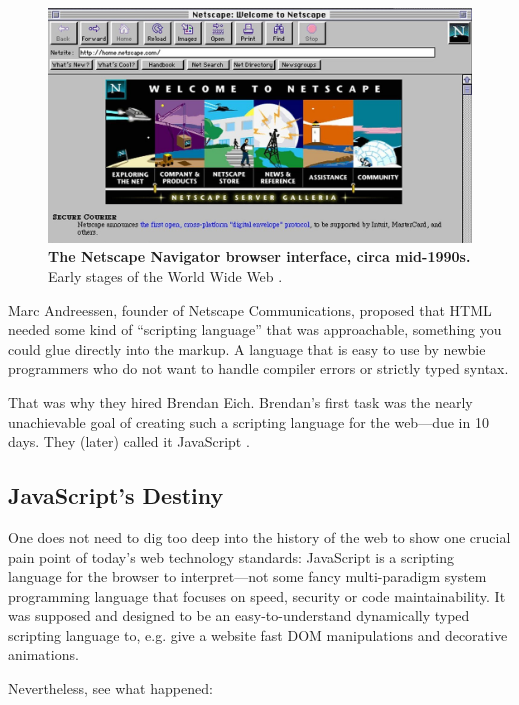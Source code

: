 \documentclass[10pt]{article}
\begin{document}
\begin{sloppypar}
  \begin{figure}[ht]
    \centering
    \includegraphics[width=\textwidth]{figures/netscape.jpg}
    \caption[The Netscape Navigator browser interface, circa mid-1990s]{\textbf{The Netscape Navigator browser interface, circa mid-1990s.} Early stages of the World Wide Web \citep{npr_home_nodate}.}
    \label{fig:netscape}
  \end{figure}

  Marc Andreessen, founder of Netscape Communications, proposed that HTML needed some kind of “scripting language” that was approachable, something you could glue directly into the markup. A language that is easy to use by newbie programmers who do not want to handle compiler errors or strictly typed syntax.

  That was why they hired Brendan Eich. Brendan’s first task was the nearly unachievable goal of creating such a scripting language for the web—due in 10 days. They (later) called it JavaScript \citep{severance_javascript_2012}.

  \subsection{JavaScript’s Destiny}
  \label{sec:javascript-destiny}

  One does not need to dig too deep into the history of the web to show one crucial pain point of today’s web technology standards: JavaScript is a scripting language for the browser to interpret—not some fancy multi-paradigm system programming language that focuses on speed, security or code maintainability. It was supposed and designed to be an easy-to-understand dynamically typed scripting language to, e.g. give a website fast DOM manipulations and decorative animations.

  Nevertheless, see what happened:


\end{sloppypar}
\end{document}

